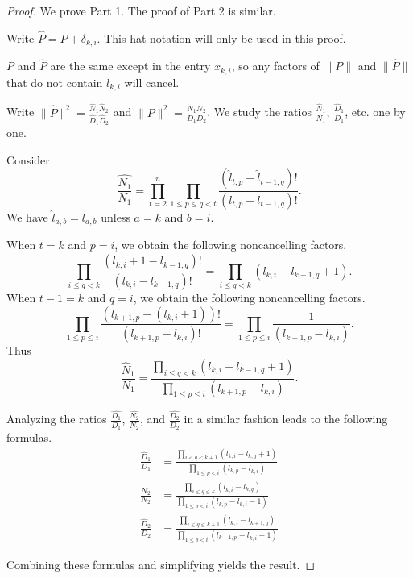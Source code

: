 \documentclass{amsart}[12pt]
\theoremstyle{definition}
\numberwithin{equation}{section}
\begin{document}
\begin{proof}
  We prove Part 1. The proof of Part 2 is similar.

  Write $\hat{P}=P+\delta_{k,i}$. This hat notation will only be used
  in this proof.  
  
$P$ and $\hat{P}$ are the same except in the entry $x_{k,i}$,
so any factors of $\| P\|$ and $\| \hat{P} \|$
that do not contain $l_{k,i}$ will cancel.

Write $\|\hat{P}\|^2 = \frac{\hat{N}_1 \hat{N}_2}{\hat{D}_1 \hat{D}_2}$ and $\|P \|^2 = \frac{N_1 N_2}{D_1 D_2}$. We study the ratios $\frac{\hat{N}_1}{N_1}$, $\frac{\hat{D}_1}{D_1} $, etc. one by one.

Consider
\[
\frac{\hat{N_1}}{N_1} = \prod_{t=2}^{n} \prod_{1 \leq p \leq q < t} \frac{(\hat{l}_{t,p}-\hat{l}_{t-1,q})!}{(l_{t,p}-l_{t-1,q})!}.
\]
We have $\hat{l}_{a,b} = l_{a,b}$ unless $a=k$ and $b=i$. 

When $t=k$ and $p=i$, we obtain the following noncancelling factors.
\[
  \prod_{i \leq q < k} \frac{(l_{k,i}+1-l_{k-1,q})!}{(l_{k,i}-l_{k-1,q})!} = \prod_{i \leq q < k} (l_{k,i}-l_{k-1,q}+1).
\] 
When $t-1=k$ and $q=i$, we obtain the following noncancelling factors.
\[
  \prod_{1 \leq p \leq i} \frac{(l_{k+1,p}-(l_{k,i}+1))!}{(l_{k+1,p}-l_{k,i})!} = \prod_{1 \leq p \leq i}  \frac{1}{(l_{k+1,p}-l_{k,i})}.
\] 
Thus
\[
\frac{\hat{N}_1}{N_1} = \frac{\prod_{i \leq q < k} (l_{k,i}-l_{k-1,q}+1)}{\prod_{1 \leq p \leq i} (l_{k+1,p}-l_{k,i})}.
\]


Analyzing the ratios $\frac{\hat{D_1}}{D_1} $, $\frac{\hat{N_2}}{N_2} $, and $\frac{\hat{D_2}}{D_2} $ in a similar fashion leads to the following formulas.
\begin{align*}
\frac{\hat{D}_1}{D_1} &= \frac{\prod_{i < q < k+1} (l_{k,i}-l_{k,q}+1)}{\prod_{1 \leq p < i}  (l_{k,p}-l_{k,i})}\\
\frac{\hat{N}_2}{N_2} &= \frac{\prod_{i \leq q \leq k} (l_{k,i}-l_{k,q})}{\prod_{1 \leq p <i}  (l_{k,p}-l_{k,i}-1)}\\
  \frac{\hat{D}_2}{D_2} &= \frac{\prod_{i \leq q \leq k+1} (l_{k,i}-l_{k+1,q})}{\prod_{1 \leq p < i} (l_{k-1,p}-l_{k,i}-1)}
\end{align*}


Combining these formulas and simplifying yields the result.
\end{proof}
\end{document}

